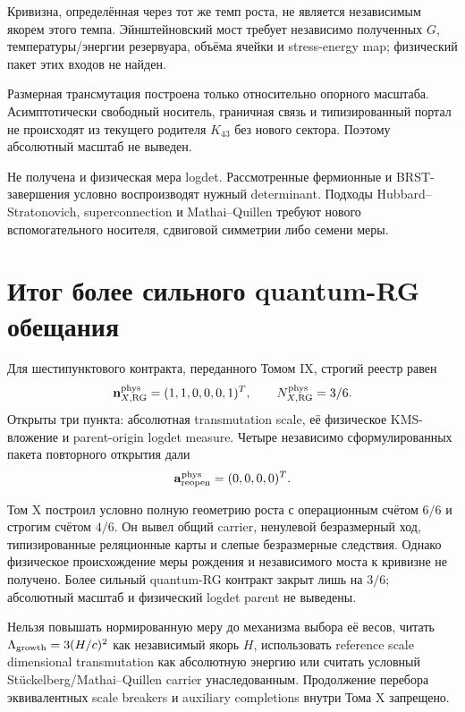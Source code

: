 Кривизна, определённая через тот же темп роста, не является независимым
якорем этого темпа. Эйнштейновский мост требует независимо полученных
$G$, температуры/энергии резервуара, объёма ячейки и stress-energy map;
физический пакет этих входов не найден.

Размерная трансмутация построена только относительно опорного масштаба.
Асимптотически свободный носитель, граничная связь и типизированный портал
не происходят из текущего родителя $K_{43}$ без нового сектора. Поэтому
абсолютный масштаб не выведен.

Не получена и физическая мера logdet. Рассмотренные фермионные и
BRST-завершения условно воспроизводят нужный determinant. Подходы
Hubbard--Stratonovich, superconnection и Mathai--Quillen требуют нового
вспомогательного носителя, сдвиговой симметрии либо семени меры.

\section{Итог более сильного quantum-RG обещания}

Для шестипунктового контракта, переданного Томом IX, строгий реестр равен
\begin{equation}
 \mathbf n_{X,\rm RG}^{\rm phys}=(1,1,0,0,0,1)^T,
 \qquad N_{X,\rm RG}^{\rm phys}=3/6.
\end{equation}
Открыты три пункта: абсолютная transmutation scale, её физическое KMS-
вложение и parent-origin logdet measure. Четыре независимо сформулированных
пакета повторного открытия дали
\begin{equation}
 \mathbf a_{\rm reopen}^{\rm phys}=(0,0,0,0)^T.
\end{equation}

\begin{theorem}
Том X построил условно полную геометрию роста с операционным счётом $6/6$
и строгим счётом $4/6$. Он вывел общий carrier, ненулевой безразмерный ход,
типизированные реляционные карты и слепые безразмерные следствия. Однако
физическое происхождение меры рождения и независимого моста к кривизне не
получено. Более сильный quantum-RG контракт закрыт лишь на $3/6$;
абсолютный масштаб и физический logdet parent не выведены.
\end{theorem}

\begin{nogocriterion}
Нельзя повышать нормированную меру до механизма выбора её весов, читать
$\Lambda_{\rm growth}=3(H/c)^2$ как независимый якорь $H$, использовать
reference scale dimensional transmutation как абсолютную энергию или
считать условный Stückelberg/Mathai--Quillen carrier унаследованным.
Продолжение перебора эквивалентных scale breakers и auxiliary completions
внутри Тома X запрещено.
\end{nogocriterion}

